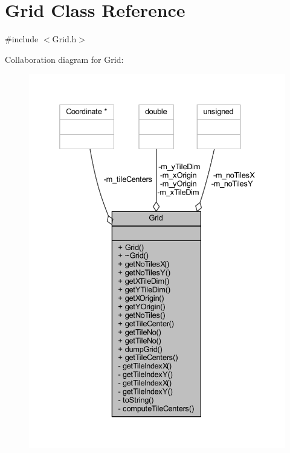 \hypertarget{class_grid}{}\section{Grid Class Reference}
\label{class_grid}


{\ttfamily \#include $<$Grid.\+h$>$}



Collaboration diagram for Grid\+:
\nopagebreak
\begin{figure}[H]
\begin{center}
\leavevmode
\includegraphics[width=332pt]{class_grid__coll__graph}
\end{center}
\end{figure}
